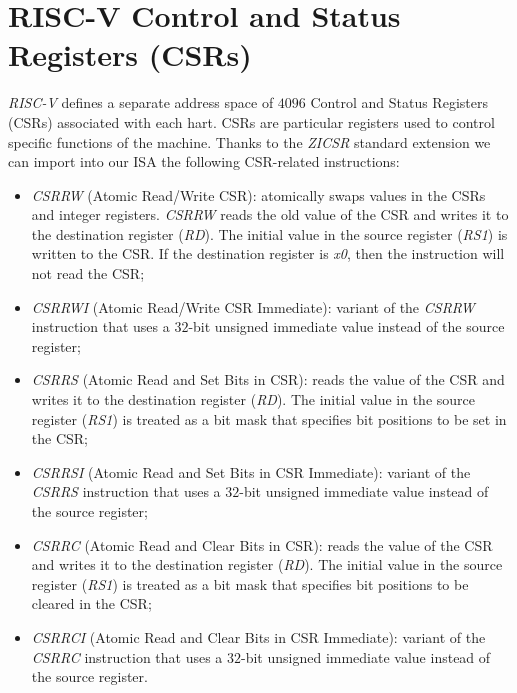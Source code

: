 \section{RISC-V Control and Status Registers (CSRs)}
\label{sec:riscv_csrs}

\textit{RISC-V} defines a separate address space of $4096$ Control and Status
Registers (CSRs) associated with each hart. CSRs are particular registers used to
control specific functions of the machine. Thanks to the \textit{ZICSR} standard
extension we can import into our ISA the following CSR-related instructions:
\begin{itemize}
  \item \textit{CSRRW} (Atomic Read/Write CSR): atomically swaps values in the CSRs
    and integer registers. \textit{CSRRW} reads the old value of the CSR and writes
    it to the destination register (\textit{RD}). The initial value in the source
    register (\textit{RS1}) is written to the CSR. If the destination register is
    \textit{x0}, then the instruction will not read the CSR;

  \item \textit{CSRRWI} (Atomic Read/Write CSR Immediate): variant of the \textit{CSRRW}
    instruction that uses a $32$-bit unsigned immediate value instead of the
    source register;

  \item \textit{CSRRS} (Atomic Read and Set Bits in CSR): reads the value of the
    CSR and writes it to the destination register (\textit{RD}). The initial value
    in the source register (\textit{RS1}) is treated as a bit mask that
    specifies bit positions to be set in the CSR;

  \item \textit{CSRRSI} (Atomic Read and Set Bits in CSR Immediate): variant of the
    \textit{CSRRS} instruction that uses a $32$-bit unsigned immediate value
    instead of the source register;

  \item \textit{CSRRC} (Atomic Read and Clear Bits in CSR): reads the value of the
    CSR and writes it to the destination register (\textit{RD}). The initial value
    in the source register (\textit{RS1}) is treated as a bit mask that
    specifies bit positions to be cleared in the CSR;

  \item \textit{CSRRCI} (Atomic Read and Clear Bits in CSR Immediate): variant of
    the \textit{CSRRC} instruction that uses a $32$-bit unsigned immediate value
    instead of the source register.
\end{itemize}

